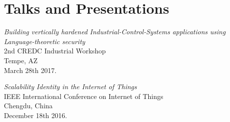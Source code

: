 \documentclass[letterpaper,10pt]{article}
\renewenvironment{itemize}{
  \begin{list}{}{
    \setlength{\leftmargin}{1.5em}
  }
}{
  \end{list}
}
\begin{document}
\section*{Talks and Presentations}
\begin{itemize}
\setlength\itemsep{0ex}
\item \textit{Building vertically hardened Industrial-Control-Systems applications using Language-theoretic security}\\ 2nd CREDC Industrial Workshop\\ Tempe, AZ\\ March 28th 2017.
\item \textit{Scalability Identity in the Internet of Things}\\ IEEE International Conference on Internet of Things\\ Chengdu, China\\ December 18th 2016.
\end{itemize}
\end{document}
